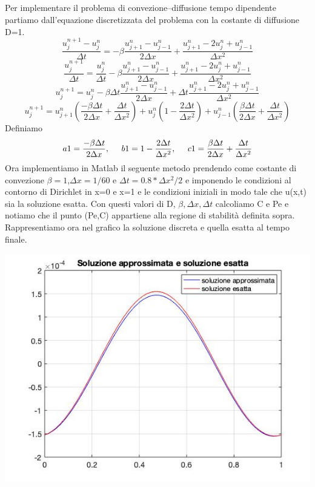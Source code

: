 \documentclass[]{article}
\begin{document}
\subsection{}
Per implementare il problema di convezione–diffusione tempo dipendente partiamo dall'equazione discretizzata del problema con la costante di diffusione D=1.
$$\frac{u^{n+1}_j-u^{n}_j}{\Delta t}=-\beta \frac{u^{n}_{j+1}-u^{n}_{j-1}}{2\Delta x}+\frac{u^{n}_{j+1}-2u^{n}_{j}+u^{n}_{j-1}}{\Delta x^{2}}$$
$$\frac{u^{n+1}_j}{\Delta t}=\frac{u^{n}_j}{\Delta t}-\beta \frac{u^{n}_{j+1}-u^{n}_{j-1}}{2\Delta x}+\frac{u^{n}_{j+1}-2u^{n}_{j}+u^{n}_{j-1}}{\Delta x^{2}}$$
$$u^{n+1}_{j}=u^{n}_{j}-\beta\Delta t \frac{u^{n}_{j+1}-u^{n}_{j-1}}{2\Delta x}+\Delta t\frac{u^{n}_{j+1}-2u^{n}_{j}+u^{n}_{j-1}}{\Delta x^{2}}$$
$$u^{n+1}_{j}=u^{n}_{j+1}(\frac{-\beta\Delta t}{2\Delta x}+\frac{\Delta t}{\Delta x^{2}})+u^{n}_{j}(1-\frac{2\Delta t}{\Delta x^{2}})+u^{n}_{j-1}(\frac{\beta\Delta t}{2\Delta x}+\frac{\Delta t}{\Delta x^{2}})$$
Definiamo\newline
$$a1=\frac{-\beta\Delta t}{2\Delta x},\hspace{0.5cm}b1=1-\frac{2\Delta t}{\Delta x^{2}},\hspace{0.5cm}c1=\frac{\beta\Delta t}{2\Delta x}+\frac{\Delta t}{\Delta x^{2}}$$
Ora implementiamo in Matlab il seguente metodo prendendo come costante di convezione $\beta=1$,$\Delta x=1/60$ e $\Delta t=0.8*\Delta x^{2}/2$ e imponendo le condizioni al contorno di Dirichlet in x=0 e x=1 e le condizioni iniziali in modo tale che u(x,t) sia la soluzione esatta.\newline
Con questi valori di D, $\beta,\Delta x,\Delta t$  calcoliamo C e Pe e notiamo che il punto (Pe,C) appartiene alla regione di stabilità definita sopra.\newline 
Rappresentiamo ora nel grafico la soluzione discreta e quella esatta al tempo finale.
\begin{center}
\includegraphics[width=0.95\linewidth]{solesatta.jpg}

\end{center}
\end{document}
